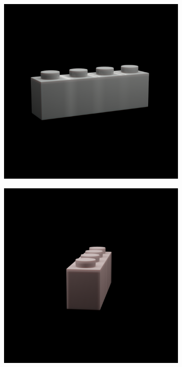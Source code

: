 \documentclass[]{article}
\begin{document}
\begin{figure}[h]
\begin{subfigure}[b]{0.2\textwidth}
    \end{subfigure}
    \begin{subfigure}[b]{0.2\textwidth}
        \includegraphics[width=\textwidth]{generated images/29.png}
    \end{subfigure}
    \begin{subfigure}[b]{0.2\textwidth}
        \includegraphics[width=\textwidth]{generated images/30.png}

\end{subfigure}
\end{figure}
\end{document}
